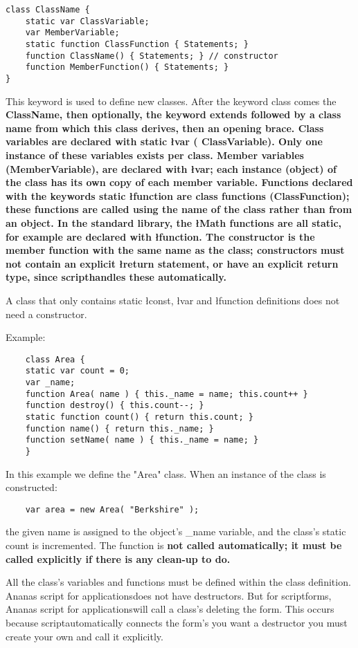 \documentclass[11pt,a4paper]{book}
\newcommand{\AS}{Ananas script for applications}
\newcommand{\Q}{script}
\newcommand{\e}{\sf}
\renewcommand{\c}{\sf}
\begin{document}
{{{{{{\begin{verbatim}
class ClassName {
    static var ClassVariable;
    var MemberVariable;
    static function ClassFunction { Statements; }
    function ClassName() { Statements; } // constructor
    function MemberFunction() { Statements; }
}
\end{verbatim}

This keyword is used to define new classes. After the keyword \c class
comes the \bf ClassName, then optionally, the keyword \c extends
followed by a class name from which this class derives, then an
opening brace. Class variables are declared with \c static \l var (\e
ClassVariable). Only one instance of these variables exists per class.
Member variables (\bf MemberVariable), are declared with \l var; each
instance (object) of the class has its own copy of each member
variable. Functions declared with the keywords \c static \l function
are class functions (\bf ClassFunction); these functions are called
using the name of the class rather than from an object. In the
standard library, the \l Math functions are all static, for example
are declared with \l function. The constructor is the member function
with the same name as the class; constructors must not contain an
explicit \l return statement, or have an explicit return type, since
\Q handles these automatically.

A class that only contains \c static \l const, \l var and \l function
definitions does not need a constructor.

Example:
\begin{verbatim}
    class Area {
	static var count = 0;
	var _name;
	function Area( name ) { this._name = name; this.count++ }
	function destroy() { this.count--; }
	static function count() { return this.count; }
	function name() { return this._name; }
	function setName( name ) { this._name = name; }
    }
\end{verbatim}
In this example we define the "Area" class. When an instance of the
class is constructed:
\begin{verbatim}
    var area = new Area( "Berkshire" );
\end{verbatim}
the given name is assigned to the object's \c _name variable, and the
class's \c static \c count is incremented. The %
function is \bf not called automatically; it must be called explicitly
if there is any clean-up to do.

All the class's variables and functions must be defined within the
class definition. \AS does not have destructors. But for \Q forms,
\AS will call a class's %
deleting the form. This occurs because \Q automatically connects the
form's %
you want a destructor you must create your own and call it explicitly.

}}}}}}
\end{document}
